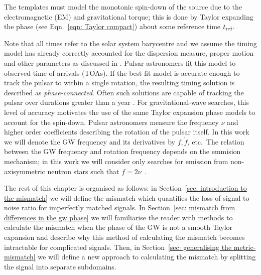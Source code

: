 \documentclass[../full_thesis/full_thesis.tex]{subfiles}
\begin{document}
The templates must model the monotonic spin-down of the source due to the
electromagnetic (EM) and gravitational torque; this is done by Taylor expanding
the phase (see Eqn.~\eqref{eqn: Taylor compact}) about some reference time
$t_{\textrm{ref}}$.

Note that all times refer to the solar system barycentre and we assume the
timing model has already correctly accounted for the dispersion measure, proper
motion and other parameters as discussed in \citet{Edwards2006}.  Pulsar
astronomers fit this model to observed time of arrivals (TOAs). If the best fit
model is accurate enough to track the pulsar to within a single rotation, the
resulting timing solution is described as \emph{phase-connected}.  Often such
solutions are capable of tracking the pulsar over durations greater than  a
year \citep{Lyne2012book}.  For gravitational-wave searches, this level of
accuracy motivates the use of the same Taylor expansion phase models to account
for the spin-down.  Pulsar astronomers measure the frequency $\nu$ and higher
order coefficients describing the rotation of the pulsar itself. In this work
we will denote the GW frequency and its derivatives by $f, \dot{f}$, etc.\ The relation between the GW frequency and rotation frequency depends on
the emmision mechanism; in this work we will consider only searches for emission from
non-axisymmetric neutron stars such that $f=2\nu$~\citep{Shapiro83}.

The rest of this chapter is organised as follows: in Section~\ref{sec:
introduction to the mismatch} we will define the mismatch which
quantifies the loss of signal to noise ratio for imperfectly matched signals.
In Section~\ref{sec: mismatch from differences in the gw phase} we will
familiarise the reader with methods to calculate the mismatch when the phase of
the GW is not a smooth Taylor expansion and describe why this method of
calculating the mismatch becomes intractable for complicated signals. Then, in
Section~\ref{sec: generalising the metric-mismatch} we will define a new approach
to calculating the mismatch by splitting the signal into separate subdomains.
\end{document}
